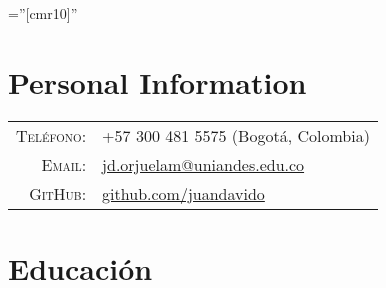 \documentclass[a4paper,10pt]{article} %
\begin{document}
\pagestyle{empty} %

\font\fb=''[cmr10]'' %



\par{ \bigskip\par} %
\par{\bigskip\par} %

\color{OrangeRed}
\section{Personal Information}
\color{black}

\begin{tabular}{rl}
\textsc{Teléfono:} & +57 300 481 5575 (Bogot\'a, Colombia)\\
\textsc{Email:} & \href{mailto:jd.orjuelam@uniandes.edu.co}{jd.orjuelam@uniandes.edu.co}\\
\textsc{GitHub:} & \url{github.com/juandavido}
\end{tabular}


\color{OrangeRed}
\section{Educación}
\color{black}
\end{document}
